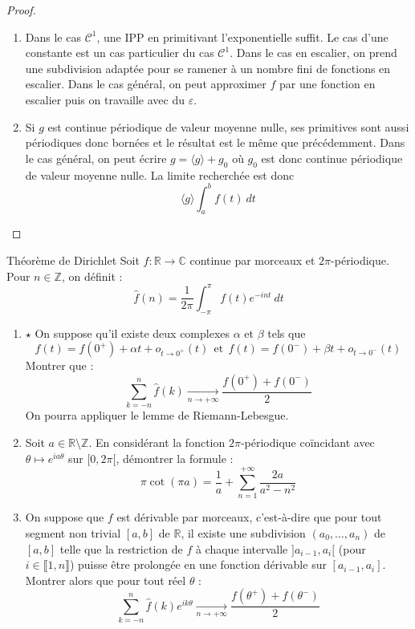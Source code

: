\documentclass[french,a4paper]{article}
\newcommand{\Z}{\mathbb{Z}}
\newcommand{\R}{\mathbb{R}}
\newcommand{\C}{\mathbb{C}}
\theoremstyle{plain}
\theoremstyle{definition}
\theoremstyle{remark}
\begin{document}
\begin{proof}
	\begin{enumerate}
		\item Dans le cas $\mathcal{C}^1$, une IPP en primitivant l'exponentielle suffit. Le cas d'une constante est un cas particulier du cas $\mathcal{C}^1$. Dans le cas en escalier, on prend une subdivision adaptée pour se ramener à un nombre fini de fonctions en escalier. Dans le cas général, on peut approximer $f$ par une fonction en escalier puis on travaille avec du $\varepsilon$.
		\item Si $g$ est continue périodique de valeur moyenne nulle, ses primitives sont aussi périodiques donc bornées et le résultat est le même que précédemment. Dans le cas général, on peut écrire $g=\langle g\rangle+g_0$ où $g_0$ est donc continue périodique de valeur moyenne nulle. La limite recherchée est donc $$\langle g\rangle\int_{a}^{b}f(t)\ dt$$
	\end{enumerate}
\end{proof}

\begin{ex}[Moulin.IG.20]{Théorème de Dirichlet}
	Soit $f:\R\to\C$ continue par morceaux et $2\pi$-périodique. Pour $n\in\Z$, on définit : $$\hat{f}(n)=\frac{1}{2\pi}\int_{-\pi}^{\pi}f(t)e^{-int}\ dt$$
	\begin{enumerate}
		\item $\star$ On suppose qu'il existe deux complexes $\alpha$ et $\beta$ tels que $$f(t)=f(0^+)+\alpha t+o_{t\to 0^+}(t)\ \ \text{et}\ \ f(t)=f(0^-)+\beta t+o_{t\to 0^-}(t)$$ Montrer que : $$\sum_{k=-n}^{n}\hat{f}(k)\xrightarrow[n\to+\infty]{}\frac{f(0^+)+f(0^-)}{2}$$ On pourra appliquer le lemme de Riemann-Lebesgue.
		\item Soit $a\in\R\setminus\Z$. En considérant la fonction $2\pi$-périodique coïncidant avec $\theta\mapsto e^{ia\theta}$ sur $[0,2\pi[$, démontrer la formule : $$\pi\cot(\pi a)=\frac{1}{a}+\sum_{n=1}^{+\infty}\frac{2a}{a^2-n^2}$$
		\item On suppose que $f$ est dérivable par morceaux, c'est-à-dire que pour tout segment non trivial $[a,b]$ de $\R$, il existe une subdivision $(a_0,\ldots,a_n)$ de $[a,b]$ telle que la restriction de $f$ à chaque intervalle $]a_{i-1},a_i[$ (pour $i\in\llbracket1,n\rrbracket$) puisse être prolongée en une fonction dérivable sur $[a_{i-1},a_i]$. \\ Montrer alors que pour tout réel $\theta$ : $$\sum_{k=-n}^{n}\hat{f}(k)e^{ik\theta}\xrightarrow[n\to+\infty]{}\frac{f(\theta^+)+f(\theta^-)}{2}$$
	\end{enumerate}
\end{ex}
\end{document}
